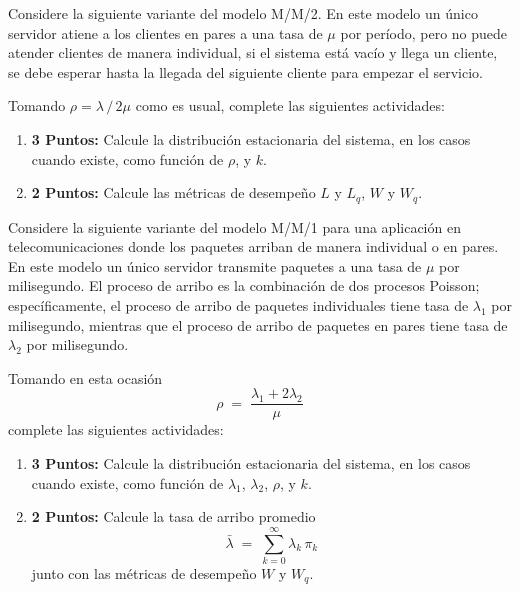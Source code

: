 \documentclass[ a4paper, twoside, 11pt]{article}
\begin{document}
\begin{problem}
\label{prob:tandem}
Considere la siguiente variante del modelo M/M/2. En este modelo un \'unico servidor atiene a los clientes en pares a una tasa de $\mu$ por per\'iodo, pero no puede atender clientes de manera individual, \eg si el sistema est\'a vac\'io y llega un cliente, se debe esperar hasta la llegada del siguiente cliente para empezar el servicio. 

\begin{figure}[htb]
\centering
\def\svgwidth{0.9\columnwidth}

\end{figure}
\halfskip

Tomando $\rho = \lambda \, / \, 2 \mu$ como es usual, complete las siguientes actividades: 
\begin{enumerate}[label=\textbf{\alph*)}]
\item \textbf{3 Puntos:} Calcule la distribuci\'on estacionaria del sistema, en los casos cuando existe, como funci\'on de $\rho$, y $k$. 
\item \textbf{2 Puntos:} Calcule las m\'etricas de desempe\~no $L$ y $L_q$, $W$ y $W_q$. 
\end{enumerate}

\end{problem}
\fullskip

\begin{problem}
\label{prob:arribos-parejas}
Considere la siguiente variante del modelo M/M/1 para una aplicaci\'on en telecomunicaciones donde los paquetes arriban de manera individual o en pares. En este modelo un \'unico servidor transmite paquetes a una tasa de $\mu$ por milisegundo. El proceso de arribo es la combinaci\'on de dos procesos Poisson; espec\'ificamente, el proceso de arribo de paquetes individuales tiene tasa de $\lambda_1$ por milisegundo, mientras que el proceso de arribo de paquetes en pares tiene tasa de $\lambda_2$ por milisegundo. 

\begin{figure}[htb]
\centering
\def\svgwidth{0.9\columnwidth}

\end{figure}
\halfskip

Tomando en esta ocasi\'on
\[
\rho \; = \; \frac{ \lambda_1 + 2 \lambda_2 }{\mu}
\]
complete las siguientes actividades: 
\begin{enumerate}[label=\textbf{\alph*)}]
\item \textbf{3 Puntos:} Calcule la distribuci\'on estacionaria del sistema, en los casos cuando existe, como funci\'on de $\lambda_1$, $\lambda_2$, $\rho$, y $k$. 
\item \textbf{2 Puntos:} Calcule la tasa de arribo promedio
\[
\bar{\lambda} \; = \; \sum_{k=0}^{\infty} \lambda_{k} \, \pi_k
\]
junto con las m\'etricas de desempe\~no $W$ y $W_q$. 
\end{enumerate}

\end{problem}
\fullskip
\end{document}
